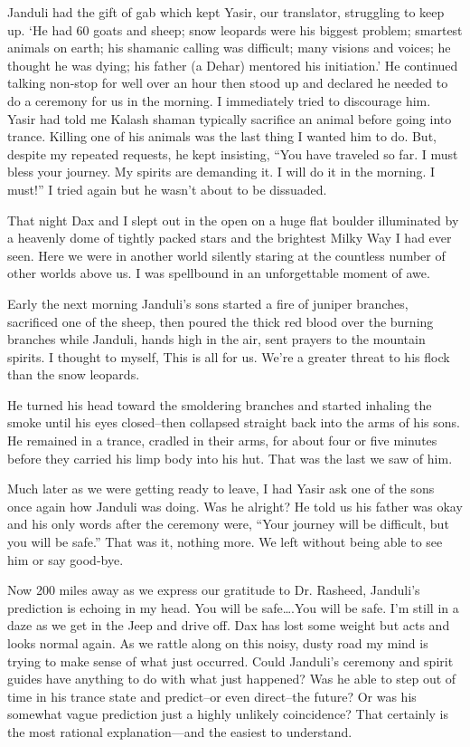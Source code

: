 \documentclass[12pt, titlepage]{article}
\begin{document}
{\begin{spacing}{1.15}
 Janduli had the gift of gab which kept Yasir, our translator, struggling to keep up.  `He had 60 goats and sheep; snow leopards were his biggest problem; smartest animals on earth; his shamanic calling was difficult; many visions and voices; he thought he was dying; his father (a Dehar) mentored his initiation.'  He continued talking non-stop for well over an hour then stood up and declared he needed to do a ceremony for us in the morning.  I immediately tried to discourage him.  Yasir had told me Kalash shaman typically sacrifice an animal before going into trance.  Killing one of his animals was the last thing I wanted him to do.  But, despite my repeated requests, he kept insisting, ``You have traveled so far. I must bless your journey.   My spirits are demanding it. I will do it in the morning.  I must!'' I tried again but he wasn't about to be dissuaded. 

That night Dax and I slept out in the open on a huge flat boulder illuminated by a heavenly dome of tightly packed stars and the brightest Milky Way I had ever seen.  Here we were in another world silently staring at the countless number of other worlds above us. I was spellbound in an unforgettable moment of awe.  

Early the next morning Janduli's sons started a fire of juniper branches, sacrificed one of the sheep, then poured the thick red blood over the burning branches while Janduli, hands high in the air, sent prayers to the mountain spirits. I thought to myself, This is all for us. We're a greater threat to his flock than the snow leopards. 

He turned his head toward the smoldering branches and started inhaling the smoke until his eyes closed--then collapsed straight back into the arms of his sons.  He remained in a trance, cradled in their arms, for about four or five minutes before they carried his limp body into his hut. That was the last we saw of him. 

Much later as we were getting ready to leave, I had Yasir ask one of the sons once again how Janduli was doing.  Was he alright?  He told us his father was okay and his only words after the ceremony were, ``Your journey will be difficult, but you will be safe.'' That was it, nothing more.  We left without being able to see him or say good-bye.

Now 200 miles away as we express our gratitude to Dr. Rasheed, Janduli's prediction is echoing in my head.  You will be safe….You will be safe.  I'm still in a daze as we get in the Jeep and drive off. Dax has lost some weight but acts and looks normal again. As we rattle along on this noisy, dusty road my mind is trying to make sense of what just occurred. Could Janduli's ceremony and spirit guides have anything to do with what just happened?  Was he able to step out of time in his trance state and predict--or even direct--the future? Or was his somewhat vague prediction just a highly unlikely coincidence?  That certainly is the most rational explanation—and the easiest to understand. 


\end{spacing}}
\end{document}
